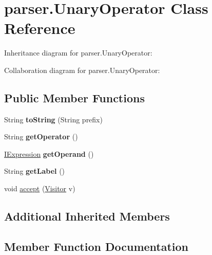 \hypertarget{classparser_1_1_unary_operator}{}\section{parser.\+Unary\+Operator Class Reference}
\label{classparser_1_1_unary_operator}


Inheritance diagram for parser.\+Unary\+Operator\+:


Collaboration diagram for parser.\+Unary\+Operator\+:
\subsection*{Public Member Functions}
\begin{DoxyCompactItemize}
\item 
String {\bfseries to\+String} (String prefix)\hypertarget{classparser_1_1_unary_operator_af502a9d59a8da6925a7ed7841f08f252}{}\label{classparser_1_1_unary_operator_af502a9d59a8da6925a7ed7841f08f252}

\item 
String {\bfseries get\+Operator} ()\hypertarget{classparser_1_1_unary_operator_a43886ebb5ea4806c52382dde01f9ed36}{}\label{classparser_1_1_unary_operator_a43886ebb5ea4806c52382dde01f9ed36}

\item 
\hyperlink{interfaceparser_1_1_i_expression}{I\+Expression} {\bfseries get\+Operand} ()\hypertarget{classparser_1_1_unary_operator_a49e25b7371d0e0d64aca3ddb62b8b9f9}{}\label{classparser_1_1_unary_operator_a49e25b7371d0e0d64aca3ddb62b8b9f9}

\item 
String {\bfseries get\+Label} ()\hypertarget{classparser_1_1_unary_operator_a58ee91b343a1c8c1354e6f425a0818fd}{}\label{classparser_1_1_unary_operator_a58ee91b343a1c8c1354e6f425a0818fd}

\item 
void \hyperlink{classparser_1_1_unary_operator_a4f157bf51c6fcc510387677deb3629ce}{accept} (\hyperlink{interfacemain_1_1_visitor}{Visitor} v)
\end{DoxyCompactItemize}
\subsection*{Additional Inherited Members}


\subsection{Member Function Documentation}
